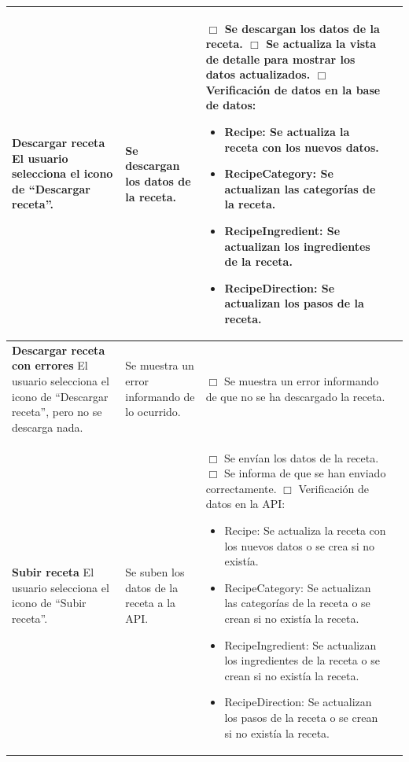 \begin{center}
\begin{longtable}{|p{3.75cm}|p{3.5cm}|p{5.25cm}|p{1.5cm}|}
    \textbf{Descargar receta}\newline
    El usuario selecciona el icono de ``Descargar receta''. &
    Se descargan los datos de la receta. &
    $\Box$ Se descargan los datos de la receta.\newline
    $\Box$ Se actualiza la vista de detalle para mostrar los datos
    actualizados.\newline
    $\Box$ Verificación de datos en la base de datos:
    \begin{itemize}
    \item Recipe: Se actualiza la receta con los nuevos datos.
    \item RecipeCategory: Se actualizan las categorías de la receta.
    \item RecipeIngredient: Se actualizan los ingredientes de la receta.
    \item RecipeDirection: Se actualizan los pasos de la receta.
    \end{itemize}
    & \\ \hline

    \textbf{Descargar receta con errores}\newline
    El usuario selecciona el icono de ``Descargar receta'', pero no se descarga
    nada.&
    Se muestra un error informando de lo ocurrido. &
    $\Box$ Se muestra un error informando de que no se ha descargado la
    receta. & \\ \hline

    \textbf{Subir receta}\newline
    El usuario selecciona el icono de ``Subir receta''. &
    Se suben los datos de la receta a la API. &
    $\Box$ Se envían los datos de la receta.\newline
    $\Box$ Se informa de que se han enviado correctamente.\newline
    $\Box$ Verificación de datos en la API:
    \begin{itemize}
    \item Recipe: Se actualiza la receta con los nuevos datos o se crea si no
      existía.
    \item RecipeCategory: Se actualizan las categorías de la receta o se crean
      si no existía la receta.
    \item RecipeIngredient: Se actualizan los ingredientes de la receta o se
      crean si no existía la receta.
    \item RecipeDirection: Se actualizan los pasos de la receta o se crean
      si no existía la receta.
    \end{itemize}
    & \\ \hline


\end{longtable}
\end{center}
